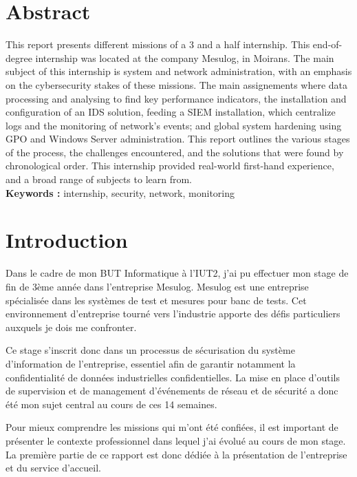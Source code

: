 \documentclass[a4paper, 11pt]{article}
\begin{document}
\section*{Abstract}
This report presents different missions of a 3 and a half internship.
This end-of-degree internship was located at the company Mesulog, in Moirans.
The main subject of this internship is system and network administration, with an emphasis on the cybersecurity stakes of these missions.
The main assignements where data processing and analysing to find key performance indicators, the installation and configuration of an IDS solution, feeding a SIEM installation, which centralize logs and the monitoring of network's events; and global system hardening using GPO and Windows Server administration.
This report outlines the various stages of the process, the challenges encountered, and the solutions that were found by chronological order.
This internship provided real-world first-hand experience, and a broad range of subjects to learn from.\\
\textbf{Keywords :} internship, security, network, monitoring
\newpage

\section*{Introduction}

Dans le cadre de mon BUT Informatique à l'IUT2, j'ai pu effectuer mon stage de fin de 3ème année dans l'entreprise Mesulog. Mesulog est une entreprise spécialisée dans les systèmes de test et mesures pour banc de tests. Cet environnement d'entreprise tourné vers l'industrie apporte des défis particuliers auxquels je dois me confronter.
 \par\bigskip

Ce stage s'inscrit donc dans un processus de sécurisation du système d'information de l'entreprise, essentiel afin de garantir notamment la confidentialité de données industrielles confidentielles. La mise en place d'outils de supervision et de management d'événements de réseau et de sécurité a donc été mon sujet central au cours de ces 14 semaines.


\par\bigskip

Pour mieux comprendre les missions qui m'ont été confiées, il est important de présenter le contexte professionnel dans lequel j'ai évolué au cours de mon stage. La première partie de ce rapport est donc dédiée à la présentation de l'entreprise et du service d'accueil.
\end{document}
